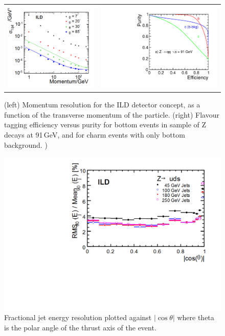 \begin{figure}[b!]
\begin{tabular}{cc}

\includegraphics[width=0.5\hsize]{chapters/figures/deltaInvP_all_fits.png} &
\includegraphics[width=0.5\hsize]{chapters/figures/evalZ-lcfiweights_qq91new_v02-test.pdf}
\end{tabular}
\caption{\label{ild:fig:intro:tracking}(left) Momentum resolution for the ILD detector concept, as a function of the transverse momentum of the particle. (right) Flavour tagging efficiency versus purity for bottom events in sample of Z decays at 91\,GeV, and for charm events with only bottom background. )}
\end{figure}



\begin{figure}[t!]

\includegraphics[width=0.8\hsize]{chapters/figures/ild01_o1_pflow.png}

\caption{\label{ild:fig:intro:pflow}Fractional jet energy resolution
    plotted against $|\cos\theta|$ where theta is the polar angle of the thrust axis of the event. }
\end{figure}

